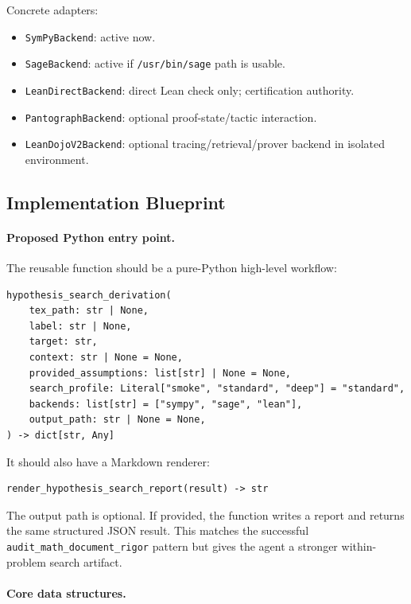 \documentclass[11pt]{article}
\begin{document}
Concrete adapters:

\begin{itemize}[leftmargin=*]
\item \texttt{SymPyBackend}: active now.
\item \texttt{SageBackend}: active if \texttt{/usr/bin/sage} path is usable.
\item \texttt{LeanDirectBackend}: direct Lean check only; certification
  authority.
\item \texttt{PantographBackend}: optional proof-state/tactic interaction.
\item \texttt{LeanDojoV2Backend}: optional tracing/retrieval/prover backend in
  isolated environment.
\end{itemize}

\subsection{Implementation Blueprint}

\paragraph{Proposed Python entry point.}
The reusable function should be a pure-Python high-level workflow:

\begin{verbatim}
hypothesis_search_derivation(
    tex_path: str | None,
    label: str | None,
    target: str,
    context: str | None = None,
    provided_assumptions: list[str] | None = None,
    search_profile: Literal["smoke", "standard", "deep"] = "standard",
    backends: list[str] = ["sympy", "sage", "lean"],
    output_path: str | None = None,
) -> dict[str, Any]
\end{verbatim}

It should also have a Markdown renderer:

\begin{verbatim}
render_hypothesis_search_report(result) -> str
\end{verbatim}

The output path is optional. If provided, the function writes a report and
returns the same structured JSON result. This matches the successful
\texttt{audit\_math\_document\_rigor} pattern but gives the agent a stronger
within-problem search artifact.

\paragraph{Core data structures.}
\end{document}
